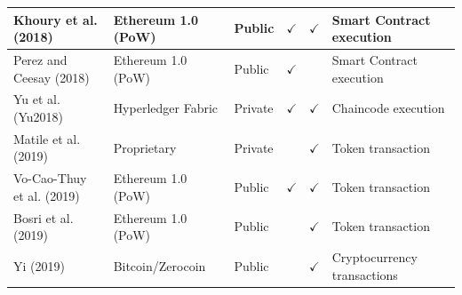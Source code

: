 \documentclass[../access.tex]{subfiles}
\begin{document}
\begin{table}[htbp]
\begin{adjustwidth}{-2cm}{}
\begin{tabular}{m{4.4cm} >{\centering\arraybackslash}m{2.9cm} >{\centering\arraybackslash}m{1.0cm} >{\centering\arraybackslash}m{1.0cm} >{\centering\arraybackslash}m{1.5cm} >{\centering\arraybackslash}m{3.6cm}}
            \hline
            \footnotesize{Khoury et al. (2018) \cite{Khoury2018}}               & \footnotesize{Ethereum 1.0 (PoW)}              & \footnotesize{Public}                            & $ \checkmark $                                         & $ \checkmark $                                        & \footnotesize{Smart Contract execution}    \\
            \hline
            \footnotesize{Perez and Ceesay (2018) \cite{Perez2018}}             & \footnotesize{Ethereum 1.0 (PoW)}              & \footnotesize{Public}                            & $ \checkmark $                                         & {}                                                    & \footnotesize{Smart Contract execution}    \\
            \hline
            \footnotesize{Yu et al. (Yu2018) \cite{Yu2018}}                     & \footnotesize{Hyperledger Fabric}              & \footnotesize{Private}                           & $ \checkmark $                                         & $ \checkmark $                                        & \footnotesize{Chaincode execution}         \\
            \hline
            \footnotesize{Matile et al. (2019) \cite{Matile2019}}               & \footnotesize{Proprietary}                     & \footnotesize{Private}                           & {}                                                     & $ \checkmark $                                        & \footnotesize{Token transaction}           \\
            \hline
            \footnotesize{Vo-Cao-Thuy et al. (2019) \cite{Vo-Cao-Thuy2019}}     & \footnotesize{Ethereum 1.0 (PoW)}              & \footnotesize{Public}                            & $ \checkmark $                                         & $ \checkmark $                                        & \footnotesize{Token transaction}           \\
            \hline
            \footnotesize{Bosri et al. (2019) \cite{Bosri2019}}                 & \footnotesize{Ethereum 1.0 (PoW)}              & \footnotesize{Public}                            & {}                                                     & $ \checkmark $                                        & \footnotesize{Token transaction}           \\
            \hline
            \footnotesize{Yi (2019) \cite{Yi2019}}                              & \footnotesize{Bitcoin/Zerocoin}                & \footnotesize{Public}                            & {}                                                     & $ \checkmark $                                        & \footnotesize{Cryptocurrency transactions} \\

\end{tabular}
\end{adjustwidth}
\end{table}
\end{document}
